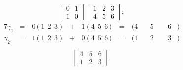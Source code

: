 \documentclass[12pt]{article}
\begin{document}
\begin{exm}
  \begin{align*}
    \begin{bmatrix}
      0 & 1\\
      1 & 0
    \end{bmatrix}
    \begin{bmatrix}
      1 & 2 & 3\\
      4 & 5 & 6
    \end{bmatrix}:
  \end{align*}
  \begin{alignat*}{7}
    \gamma_1 &=&\ 0(1\ \ 2\ \ 3) &+&\ 1(4\ \ 5\ \ 6)
      &=&\ (4&\ &5&\ \ &6&)\\
    \gamma_2 &=&\ 1(1\ \ 2\ \ 3) &+&\ 0(4\ \ 5\ \ 6)
      &=&\ (1&\ &2&\ \ &3&)\\
  \end{alignat*}
  \begin{align*}
    \begin{bmatrix}
      4 & 5 & 6\\
      1 & 2 & 3
    \end{bmatrix}.
  \end{align*}
\end{exm}
\end{document}
